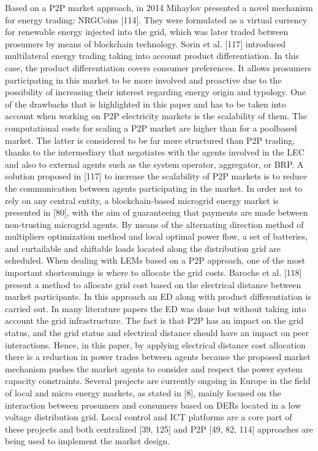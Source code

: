 Based on a P2P market approach, in 2014 Mihaylov presented a novel mechanism for energy trading: NRGCoins [114]. They were formulated as a virtual currency for renewable energy injected into the grid, which was later traded between prosumers by means of blockchain technology. Sorin et al. [117] introduced multilateral energy trading taking into account product differentiation. In this case, the product differentiation covers consumer preferences. It allows prosumers participating in this market to be more involved and
proactive due to the possibility of increasing their interest regarding energy origin and typology. One of the drawbacks that is highlighted in this paper and has to be taken into account when working on P2P electricity markets is the scalability of them. The computational costs for scaling a P2P market are higher than for a poolbased market. The latter is considered to be far more structured than P2P trading, thanks to the intermediary that negotiates with the agents involved in the LEC and also to external agents such as the system operator, aggregator, or BRP. A solution proposed in [117] to increase the scalability of P2P markets is to reduce the communication between agents participating in the market. In order not to rely on any central entity, a blockchain-based microgrid energy market is presented in [80], with the aim of guaranteeing that payments are made between non-trusting microgrid agents. By means of the alternating direction method of multipliers optimization method and local optimal power flow, a set of batteries, and curtailable and shiftable loads located along the distribution grid are scheduled. When dealing with LEMs based on a P2P approach, one of the most important shortcomings is where to allocate the grid costs. Baroche et al. [118] present a method to
allocate grid cost based on the electrical distance between market participants. In this approach an ED along with product differentiation is carried out. In many literature papers the ED was done but without taking into account the grid infrastructure. The fact is that P2P has an impact on the grid status, and the grid status and electrical distance should have an impact on peer interactions. Hence, in this paper, by applying electrical distance cost allocation there is a reduction in power trades between agents because the proposed market mechanism pushes the market agents to consider and respect the power system capacity constraints.
Several projects are currently ongoing in Europe in the field of local and micro energy markets, as stated in [8], mainly focused on the interaction between prosumers and consumers based on DERs located in a low voltage distribution grid. Local control and ICT platforms are a core part of these projects and both centralized [39, 125] and P2P [49, 82, 114] approaches are being used to implement the market design.
